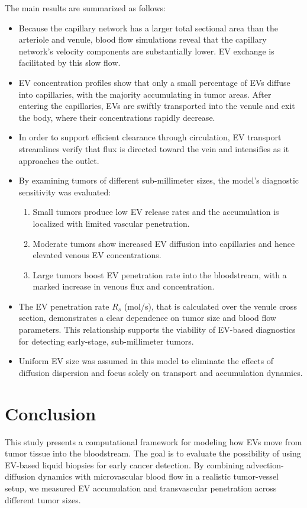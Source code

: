 \documentclass[sigconf]{acmart}
\begin{document}
The main results are summarized as follows:
\begin{itemize}
  \item Because the capillary network has a larger total  sectional area than the arteriole and venule, blood flow simulations reveal that the capillary network's velocity components are substantially lower. EV exchange is facilitated by this slow flow.
  
  \item EV concentration profiles show that only a small percentage of EVs diffuse into capillaries, with the majority accumulating in tumor areas. After entering the capillaries, EVs are swiftly transported into the venule and exit the body, where their concentrations rapidly decrease.
  
  \item In order to support efficient clearance through circulation, EV transport streamlines verify that flux is directed toward the vein and intensifies as it approaches the outlet.
  
  \item By examining tumors of different sub-millimeter sizes, the model's diagnostic sensitivity was evaluated:
  \begin{enumerate}
    \item Small tumors produce low EV release rates and the accumulation is localized with limited vascular penetration.
    \item Moderate tumors show increased EV diffusion into capillaries and hence elevated venous EV concentrations.
    \item Large tumors boost EV penetration rate into the bloodstream, with a marked increase in venous flux and concentration.
  \end{enumerate}
  
  \item The EV penetration rate \( R_s \) (mol/s), that is calculated over the venule cross section, demonstrates a clear dependence on tumor size and blood flow parameters. This relationship supports the viability of EV-based diagnostics for detecting early-stage, sub-millimeter tumors.

  \item Uniform EV size was assumed in this model to eliminate the effects of diffusion dispersion and focus solely on transport and accumulation dynamics.
\end{itemize}


\section{Conclusion}
\label{sec: conclusion}
This study presents a computational framework for modeling how EVs move from tumor tissue into the bloodstream. The goal is to evaluate the possibility of using EV-based liquid biopsies for early cancer detection. By combining advection-diffusion dynamics with microvascular blood flow in a realistic tumor-vessel setup, we measured EV accumulation and transvascular penetration across different tumor sizes.
\end{document}
